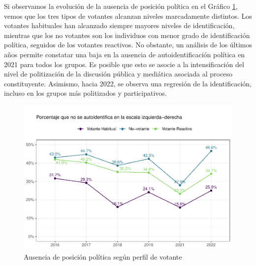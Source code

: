 \documentclass[
  12pt,
]{book}
\begin{document}
Si observamos la evolución de la ausencia de posición política en el Gráfico \ref{fig:graf-sin-posicion-2}, vemos que los tres tipos de votantes alcanzan niveles marcadamente distintos. Los votantes habituales han alcanzado siempre mayores niveles de identificación, mientras que los no votantes son los individuos con menor grado de identificación política, seguidos de los votantes reactivos. No obstante, un análisis de los últimos años permite constatar una baja en la ausencia de autoidentificación política en 2021 para todos los grupos. Es posible que esto se asocie a la intensificación del nivel de politización de la discusión pública y mediática asociada al proceso constituyente. Asimismo, hacia 2022, se observa una regresión de la identificación, incluso en los grupos más politizados y participativos.

\begin{figure}

{\centering \includegraphics{reporte-elsoc_files/figure-latex/graf-sin-posicion-2-1} 

}

\caption{Ausencia de posición política según perfil de votante}\label{fig:graf-sin-posicion-2}
\end{figure}
\end{document}
